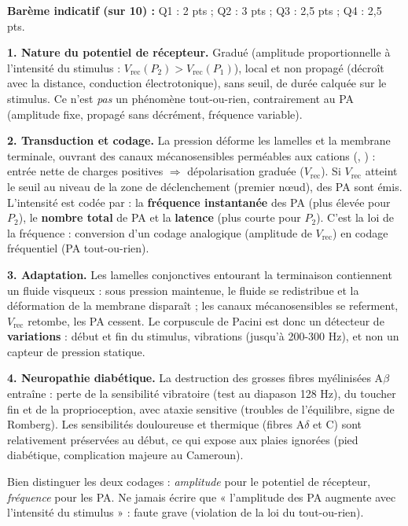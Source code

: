 \documentclass[11pt]{article}
\begin{document}
\begin{corrige}
\textbf{Barème indicatif (sur 10) :} Q1 : 2 pts ; Q2 : 3 pts ; Q3 : 2,5 pts ; Q4 : 2,5 pts.

\textbf{1. Nature du potentiel de récepteur.} Gradué (amplitude proportionnelle à l'intensité du stimulus : $V_{\text{rec}}(P_2) > V_{\text{rec}}(P_1)$), local et non propagé (décroît avec la distance, conduction électrotonique), sans seuil, de durée calquée sur le stimulus. Ce n'est \emph{pas} un phénomène tout-ou-rien, contrairement au PA (amplitude fixe, propagé sans décrément, fréquence variable).

\textbf{2. Transduction et codage.} La pression déforme les lamelles et la membrane terminale, ouvrant des canaux mécanosensibles perméables aux cations (, ) : entrée nette de charges positives $\Rightarrow$ dépolarisation graduée ($V_{\text{rec}}$). Si $V_{\text{rec}}$ atteint le seuil au niveau de la zone de déclenchement (premier nœud), des PA sont émis. L'intensité est codée par : la \textbf{fréquence instantanée} des PA (plus élevée pour $P_2$), le \textbf{nombre total} de PA et la \textbf{latence} (plus courte pour $P_2$). C'est la loi de la fréquence : conversion d'un codage analogique (amplitude de $V_{\text{rec}}$) en codage fréquentiel (PA tout-ou-rien).

\textbf{3. Adaptation.} Les lamelles conjonctives entourant la terminaison contiennent un fluide visqueux : sous pression maintenue, le fluide se redistribue et la déformation de la membrane disparaît ; les canaux mécanosensibles se referment, $V_{\text{rec}}$ retombe, les PA cessent. Le corpuscule de Pacini est donc un détecteur de \textbf{variations} : début et fin du stimulus, vibrations (jusqu'à 200-300 Hz), et non un capteur de pression statique.

\textbf{4. Neuropathie diabétique.} La destruction des grosses fibres myélinisées A$\beta$ entraîne : perte de la sensibilité vibratoire (test au diapason 128 Hz), du toucher fin et de la proprioception, avec ataxie sensitive (troubles de l'équilibre, signe de Romberg). Les sensibilités douloureuse et thermique (fibres A$\delta$ et C) sont relativement préservées au début, ce qui expose aux plaies ignorées (pied diabétique, complication majeure au Cameroun).

\begin{attention}
Bien distinguer les deux codages : \emph{amplitude} pour le potentiel de récepteur, \emph{fréquence} pour les PA. Ne jamais écrire que « l'amplitude des PA augmente avec l'intensité du stimulus » : faute grave (violation de la loi du tout-ou-rien).
\end{attention}
\end{corrige}
\end{document}
